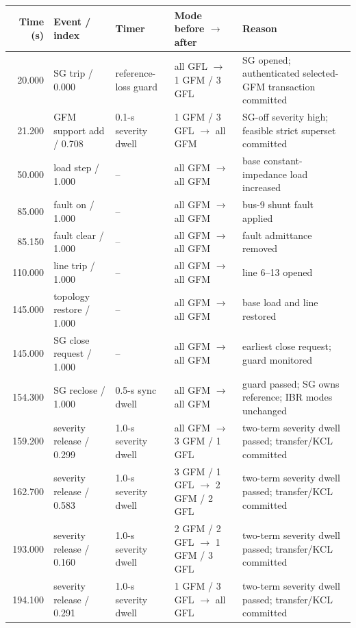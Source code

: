 \begin{tabularx}{\textwidth}{@{}r p{} p{} p{} X@{}}\toprule
Time (s) & Event / index & Timer & Mode before $\to$ after & Reason \\ \midrule
20.000 & SG trip / 0.000 & reference-loss guard & all GFL $\to$ 1 GFM / 3 GFL & SG opened; authenticated selected-GFM transaction committed \\
21.200 & GFM support add / 0.708 & 0.1-s severity dwell & 1 GFM / 3 GFL $\to$ all GFM & SG-off severity high; feasible strict superset committed \\
50.000 & load step / 1.000 & -- & all GFM $\to$ all GFM & base constant-impedance load increased \\
85.000 & fault on / 1.000 & -- & all GFM $\to$ all GFM & bus-9 shunt fault applied \\
85.150 & fault clear / 1.000 & -- & all GFM $\to$ all GFM & fault admittance removed \\
110.000 & line trip / 1.000 & -- & all GFM $\to$ all GFM & line 6--13 opened \\
145.000 & topology restore / 1.000 & -- & all GFM $\to$ all GFM & base load and line restored \\
145.000 & SG close request / 1.000 & -- & all GFM $\to$ all GFM & earliest close request; guard monitored \\
154.300 & SG reclose / 1.000 & 0.5-s sync dwell & all GFM $\to$ all GFM & guard passed; SG owns reference; IBR modes unchanged \\
159.200 & severity release / 0.299 & 1.0-s severity dwell & all GFM $\to$ 3 GFM / 1 GFL & two-term severity dwell passed; transfer/KCL committed \\
162.700 & severity release / 0.583 & 1.0-s severity dwell & 3 GFM / 1 GFL $\to$ 2 GFM / 2 GFL & two-term severity dwell passed; transfer/KCL committed \\
193.000 & severity release / 0.160 & 1.0-s severity dwell & 2 GFM / 2 GFL $\to$ 1 GFM / 3 GFL & two-term severity dwell passed; transfer/KCL committed \\
194.100 & severity release / 0.291 & 1.0-s severity dwell & 1 GFM / 3 GFL $\to$ all GFL & two-term severity dwell passed; transfer/KCL committed \\
\bottomrule\end{tabularx}
